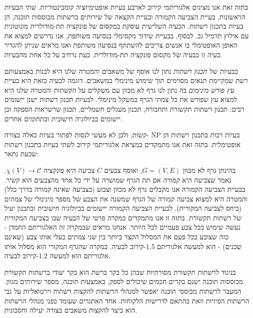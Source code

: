 \begin{hebrew}
בתזה זאת אנו מציגים אלגוריתמי קירוב לארבע בעיות אופטימיזציה קומבינטוריות.
שתי הבעיות הראשונות, בעיית הצביעה הקמורה ובעיית הקצאה של שירותים ברשתות מבוססות תוכנה, הן בעיות בתכנון רשתות.
הבעיה השלישית עוסקת במקסום של פונקציה תת-מודולרית מונוטונית עם אילוץ תרמיל גב.
לבסוף, בבעיית שידוך מקסימלי בנסיעה משותפת, אנו נדרשים למצוא את האופן האופטימלי בו אנשים צריכים להשתתף בנסיעה משותפת ואנו מראים שניתן להגדיר בעיה זו כבעיה של מקסום פונקציה תת-מודולרית.
כעת נרחיב על כל אחת מהבעיות.

בבעיות של
\emph{תכנון רשתות}
נתון לנו אוסף של משאבים והמטרה שלנו היא לבנות באמצעותם רשת שמקיימת תנאים מסוימים תוך שימוש מינימלי במשאבים.
דוגמה לבעיה כזאת היא בעיית
\emph{עץ פורש מינימום}
בה נתון לנו גרף לא מכוון עם משקלים על הקשתות והמטרה שלנו היא למצוא עץ שפורש את כל צמתי הגרף במשקל מינימלי.
לבעיות תכנון רשתות ישנן יישומים רבים: תכנון רשתות תקשורת ותחבורה, תכנון מעגלים חשמליים, תכנון שרשראות הספקה וכן יישומים  בביולוגיה חישובית ובתחומים אחרים.

בעיות רבות בתכנון רשתות הן
$\text{NP}$
-קשות, ולכן לא מעשי לנסות לפתור בעיות כאלה בצורה אופטימלית.
בתזה זאת אנו מתמקדים במציאת אלגוריתמי קירוב לשתי בעיות בתכנון רשתות שכעת נתאר:

בהינתן גרף לא מכוון
$G = (V, E)$,
ואוסף צבעים
$C$
צביעה היא פונקציה
$\chi(V) \to \mathbb{\mathcal{C}}$.
נאמר שצביעה היא
\emph{קמורה}
אם תת הגרף שמושרה על ידי כל אחד מהצבעים הוא קשיר.
בבעיית הצביעה הקמורה אנו מקבלים גרף לא מכוון וצבוע (בצביעה שאינה קמורה בדרך כלל) והמטרה היא למצוא צביעה קמורה של הגרף שמשנה את הצבע של מספר מינימלי של צמתים (ביחס לצביעה המקורית).
לבעיית הצביעה הקמורה יישומים בביולוגיה חישובית ובתכנון יעיל של רשתות תקשורת.
בתזה זו אנו מתמקדים במקרה פרטי של הבעיה שבו בצביעה המקורית נעשה שימוש בכל צבע פעמיים לכל היותר.
אנחנו מראים שבמקרה זה האלגוריתם החמדן - כזה שצובע בכל פעם את המסלול הקצר ביותר בין שני צמתים בעלי אותו צבע (שאינם שכנים) - הוא למעשה אלגוריתם 1.5-קירוב לבעיה.
במקרה שהגרף המקורי הוא מסלול אותו אלגוריתם הוא למעשה 1.2-קירוב לבעיה.


בניגוד לרשתות תקשורת מסורתיות שבהן כל בקר ברשת הוא בקר יעודי ברשתות תקשורת מבוססות תוכנה ישנם בקרים חכמים שיכולים לספק, באמצעות תוכנה, מספר שירותים מגוון.
המעבר לרשתות מבוססי תוכנה יאפשר למנהלי הרשתות להקצות רשתות וירטואליות על גבי הרשתות הפיזיות וזאת בהתאם לדרישות הלקוחות.
אחד האתגרים שעומד בפני מנהלי הרשתות הוא כיצד להקצות משאבים בצורה יעילה וחסכונית.


\end{hebrew}
